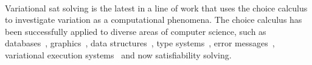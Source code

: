 ~\label{section:related-work:variational-systems}
%

Variational \ac{sat} solving is the latest in a line of work that uses the
choice calculus to investigate variation as a computational phenomena. The
choice calculus has been successfully applied to diverse areas of computer
science, such as databases~\citep{ATW17dbpl,ATW18poly},
graphics~\citep{ES18diagrams}, data
structures~\citep{MMWWK17vamos,Walk14onward,SE17fosd,EWC13fosd}, type
systems~\citep{CCEW18popl,CCW18icfp,CEW:TOPLAS14,CEW12icfp}, error
messages~\citep{CES17jvlc,CE14popl,CEW12icfp,CES14hcc}, variational execution
systems~\citep{10.1145/3276487,M14} and now satisfiability solving.


